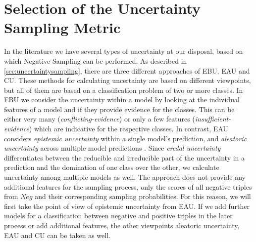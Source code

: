 \section{Selection of the Uncertainty Sampling Metric} 
\label{sec:selection_of_the_uncertainty_sampling_metric}
In the literature we have several types of uncertainty at our disposal, based on which Negative Sampling can be performed.
As described in \autoref{sec:uncertaintysampling}, there are three different approaches of \ac{EBU}, \ac{EAU} and \ac{CU}.
These methods for calculating uncertainty are based on different viewpoints, but all of them are based on a classification problem of two or more classes.
In \ac{EBU} we consider the uncertainty within a model by looking at the individual features of a model and if they provide evidence for the classes.
This can be either very many (\textit{conflicting-evidence}) or only a few features (\textit{insufficient-evidence}) which are indicative for the respective classes.
In contrast, \ac{EAU} considers \textit{epistemic uncertainty} within a single model’s prediction, and \textit{aleatoric uncertainty} across multiple model predictions \cite{human-in-the-loop}.
Since \textit{credal uncertainty} differentiates between the reducible and irreducible part of the uncertainty in a prediction and the domination of one class over the other, we calculate uncertainty among multiple models as well.
The \kbgan approach does not provide any additional features for the sampling process, only the scores of all negative triples from $Neg$ and their corresponding sampling probabilities.
For this reason, we will first take the point of view of epistemic uncertainty from \ac{EAU}.
If we add further models for a classification between negative and positive triples in the later process or add additional features, the other viewpoints aleatoric uncertainty, \ac{EAU} and \ac{CU} can be taken as well.




